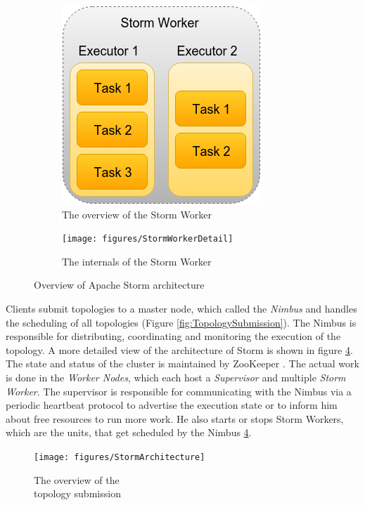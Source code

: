\documentclass[conference]{IEEEtran}
\begin{document}
\begin{figure}[!h]
\centering
	\begin{subfigure}{.55\columnwidth}
		\includegraphics[scale=0.35]{figures/StormWorker}
		    \caption{The overview of the Storm Worker}
		    \label{fig:StormWorkerOverview}
	\end{subfigure}\hspace{2.9em}
	\begin{subfigure}{1.35\columnwidth}
		\texttt{[image: figures/StormWorkerDetail]}
		    \caption{The internals of the Storm Worker}
		    \label{fig:StormWorkerDetail}
	\end{subfigure}\hfill
\label{fig:StormArchitectureOverview}
\caption{Overview of Apache Storm architecture}
\end{figure}

Clients submit topologies to a master node, which called the \emph{Nimbus} and handles the scheduling of all topologies (Figure \ref{fig:TopologySubmission}).
The Nimbus is responsible for distributing, coordinating and monitoring the execution of the topology.
A more detailed view of the architecture of Storm is shown in figure \ref{fig:StormArchitecture}.
The state and status of the cluster is maintained by ZooKeeper \cite{Zookeeper}.
The actual work is done in the \emph{Worker Nodes}, which each host a \emph{Supervisor} and multiple \emph{Storm Worker}.
The supervisor is responsible for communicating with the Nimbus via a periodic heartbeat protocol to advertise the execution state or to inform him about free resources to run more work.
He also starts or stops Storm Workers, which are the units, that get scheduled by the Nimbus \ref{fig:StormArchitecture}.

\begin{figure}[!hb]
		\texttt{[image: figures/StormArchitecture]}
		\caption{The overview of the \\topology submission}
		\label{fig:StormArchitecture}
\end{figure}
\end{document}

